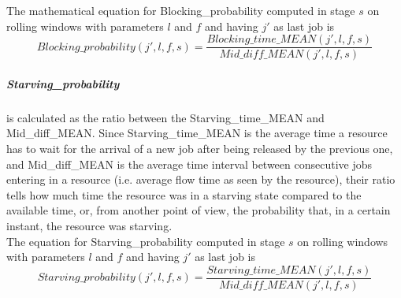 The mathematical equation for Blocking\_probability computed in stage $s$ on rolling windows with parameters $l$ and $f$ and having $j'$ as last job is
\[Blocking\_probability(j',l,f,s)=\frac{Blocking\_time\_MEAN(j',l,f,s)}{Mid\_diff\_MEAN(j',l,f,s)}\]
\subparagraph{Starving\_probability} is calculated as the ratio between the Starving\_time\_MEAN and Mid\_diff\_MEAN. Since Starving\_time\_MEAN is the average time a resource has to wait for the arrival of a new job after being released by the previous one, and Mid\_diff\_MEAN is the average time interval between consecutive jobs entering in a resource (i.e. average flow time as seen by the resource), their ratio tells how much time the resource was in a starving state compared to the available time, or, from another point of view, the probability that, in a certain instant, the resource was starving. \\
The equation for Starving\_probability computed in stage $s$ on rolling windows with parameters $l$ and $f$ and having $j'$ as last job is
\[Starving\_probability(j',l,f,s)=\frac{Starving\_time\_MEAN(j',l,f,s)}{Mid\_diff\_MEAN(j',l,f,s)}\]






